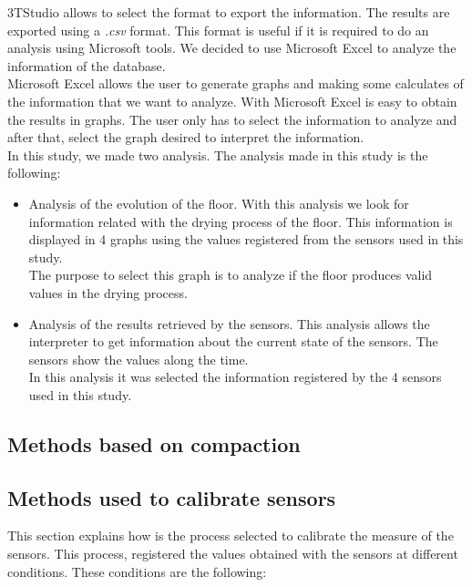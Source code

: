 3TStudio allows to select the format to export the information. The results are exported using a \textit{.csv} format. This format is useful if it is required to do an analysis using Microsoft tools. We decided to use Microsoft Excel to analyze the information of the database.\\


Microsoft Excel allows the user to generate graphs and making some calculates of the information that we want to analyze. With Microsoft Excel is easy to obtain the results in graphs. The user only has to select the information to analyze and after that, select the graph desired to interpret the information.\\

In this study, we made two analysis. The analysis made in this study is the following:

\begin{itemize}

\item Analysis of the evolution of the floor. With this analysis we look for information related with the drying process of the floor. This information is displayed in 4 graphs using the values registered from the sensors used in this study.\\

The purpose to select this graph is to analyze if the floor produces valid values in the drying process.

\item Analysis of the results retrieved by the sensors. This analysis allows the interpreter to get information about the current state of the sensors. The sensors show the values along the time.\\

In this analysis it was selected the information registered by the 4 sensors used in this study.

\end{itemize}

\subsection{Methods based on compaction}

\subsection{Methods used to calibrate sensors}

This section explains how is the process selected to calibrate the measure of the sensors. This process, registered the values obtained with the sensors at different conditions. These conditions are the following:

